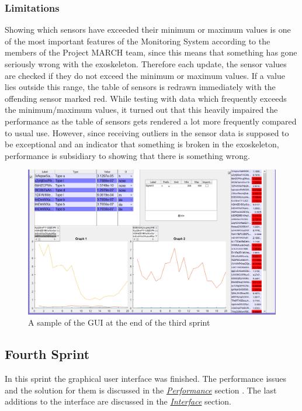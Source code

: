 \subsubsection{Limitations}
\label{sec:LimS3}
Showing which sensors have exceeded their minimum or maximum values is one of the most important features of the Monitoring System according to the members of the Project MARCH team, since this means that something has gone seriously wrong with the exoskeleton. Therefore each update, the sensor values are checked if they do not exceed the minimum or maximum values. If a value lies outside this range, the table of sensors is redrawn immediately with the offending sensor marked red. While testing with data which frequently exceeds the minimum/maximum values, it turned out that this heavily impaired the performance as the table of sensors gets rendered a lot more frequently compared to usual use. However, since receiving outliers in the sensor data is supposed to be exceptional and an indicator that something is broken in the exoskeleton, performance is subsidiary to showing that there is something wrong.


\begin{figure}[H]
	\centering
	\includegraphics[width=.75\textwidth]{images/GUIV2}
	\caption{A sample of the GUI at the end of the third sprint} 
	\label{fig:GUIV2}
\end{figure} 

\subsection{Fourth Sprint}
In this sprint the graphical user interface was finished. The performance issues and the solution for them is discussed in the \hyperref[sec:PerfS4]{\textit{Performance}} section . The last additions to the interface are discussed in the \hyperref[sec:GUIS4]{\textit{Interface}} section. 

